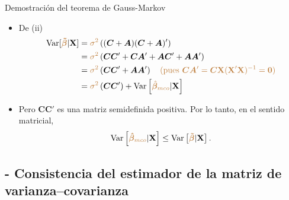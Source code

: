 \documentclass[10pt, xcolor=dvipsnames]{beamer}
\begin{document}
\begin{frame}{Demostración del teorema de Gauss-Markov}
	\begin{itemize}
		\item De (ii)
	\begin{align*}
		\begin{split}
		\operatorname{Var}[\textcolor{brown}{\boldsymbol{\tilde{\beta}}}|\textbf{X}] &= \textcolor{brown}{\sigma^2} \left((\boldsymbol{C}+\boldsymbol{A})(\boldsymbol{C}+\boldsymbol{A})'\right) \\
		&= \textcolor{brown}{\sigma^2} \left(\boldsymbol{C} \boldsymbol{C}'+\boldsymbol{C}\boldsymbol{A}'+ \boldsymbol{A}\boldsymbol{C}'+\boldsymbol{A}\boldsymbol{A}'\right) \\	
		&= \textcolor{brown}{\sigma^2} \left(\boldsymbol{C} \boldsymbol{C}'+\boldsymbol{A}\boldsymbol{A}'\right) \quad \text{\color{brown}(pues $\boldsymbol{C}\boldsymbol{A}' = \boldsymbol{C}\textbf{X}(\textbf{X}'\textbf{X})^{-1} = \boldsymbol{0}$)} \\				
		&= \textcolor{brown}{\sigma^2} \left(\boldsymbol{C} \boldsymbol{C}'\right)+ \operatorname{Var}\left[\textcolor{brown}{\hat{\boldsymbol{\beta}}_{mco}}|\textbf{X}\right]\\		
		\end{split}	
	\end{align*}	
\item Pero $\boldsymbol{C} \boldsymbol{C}'$ es una matriz semidefinida positiva. Por lo tanto, en el sentido matricial,
\begin{align*}
	\begin{split}
		\operatorname{Var}\left[\textcolor{brown}{\boldsymbol{\hat{\beta}}_{mco}}|\textbf{X}\right] \leq \operatorname{Var}\left[\textcolor{brown}{\boldsymbol{\tilde{\beta}}}|\textbf{X}\right].
	\end{split}
\end{align*}
	\end{itemize}
\end{frame}


\subsection*{- Consistencia del estimador de la matriz de varianza–covarianza}
\end{document}
